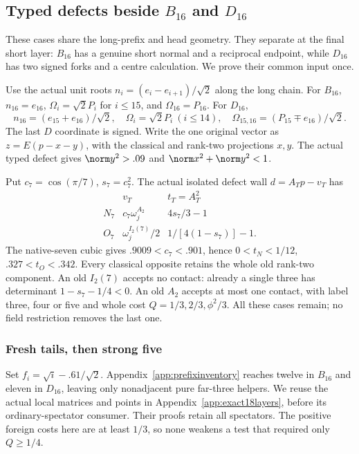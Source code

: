 \subsection{Typed defects beside \(B_{16}\) and \(D_{16}\)}
\label{app:BD16typed18}
These cases share the long-prefix and head geometry. They separate at
the final short layer: \(B_{16}\) has a genuine short normal and a
reciprocal endpoint, while \(D_{16}\) has two signed forks and a
centre calculation. We prove their common input once.

Use the actual unit roots \(n_i=(e_i-e_{i+1})/\sqrt2\) along
the long chain. For \(B_{16}\), \(n_{16}=e_{16}\),
\(\Omega_i=\sqrt2P_i\) for \(i\le15\), and
\(\Omega_{16}=P_{16}\). For \(D_{16}\),
\[
 n_{16}=(e_{15}+e_{16})/\sqrt2,\quad
 \Omega_i=\sqrt2P_i\ (i\le14),\quad
 \Omega_{15,16}=(P_{15}\mp e_{16})/\sqrt2.
\]
The last \(D\) coordinate is signed. Write the one original vector
as \(z=E(p-x-y)\), with the classical and rank-two projections
\(x,y\). The actual typed defect gives \(\norm y^2>.09\) and
\(\norm x^2+\norm y^2<1\).

Put \(c_7=\cos(\pi/7)\), \(s_7=c_7^2\).
The actual isolated defect wall \(d=A_Tp-v_T\) has
\[
\begin{array}{c|c|c}
&v_T&t_T=A_T^2\\\hline
N_7&c_7\omega_j^{A_2}&4s_7/3-1\\
O_7&\omega_j^{I_2(7)}/2&1/[4(1-s_7)]-1.
\end{array}
\]
The native-seven cubic gives \(.9009<c_7<.901\), hence
\(0<t_N<1/12\), \(.327<t_O<.342\).
Every classical opposite retains the whole old rank-two component.
An old \(I_2(7)\) accepts no contact: already a single three
has determinant \(1-s_7-1/4<0\). An old \(A_2\) accepts at
most one contact, with label three, four or five and whole cost
\(Q=1/3,2/3,\phi^2/3\). All these cases remain; no field
restriction removes the last one.

\subsubsection{Fresh tails, then strong five}
Set \(f_i=\sqrt i-.61/\sqrt2\). Appendix~\ref{app:prefixinventory}
reaches twelve in \(B_{16}\) and eleven in \(D_{16}\), leaving
only nonadjacent pure far-three helpers. We reuse the actual local
matrices and points in Appendix~\ref{app:exact18layers}, before
its ordinary-spectator consumer. Their proofs retain all spectators.
The positive foreign costs here are at least \(1/3\), so none
weakens a test that required only \(Q\ge1/4\).

